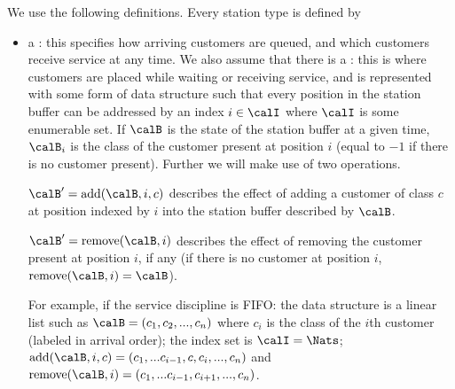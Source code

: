 We use the following definitions. Every station
type is defined by
%
\begin{itemize}
   \item a : this specifies how arriving
       customers are queued, and which customers receive
       service at any time.
    We also assume that there is a : this is where
    customers are placed while waiting or
    receiving service, and is represented with
    some form of data structure such that
    every position in the station buffer can be
    addressed by an index $i\in\calI$ where
    $\calI$ is some enumerable set. If $\calB$ is the state of
    the station buffer at a given time, $\calB_i$ is the class of the
    customer present at position $i$ (equal to
    $-1$ if there is no customer present).
    Further we will make use of
    two operations.

    $\calB' = \mathrm{add}(\calB,i,c)$ describes the
    effect of adding a customer of class
    $c$ at position indexed by $i$ into the station buffer described by
    $\calB$.

     $\calB' = \mathrm{remove}(\calB,i)$ describes the
    effect of removing the customer present at
    position $i$, if any (if there is no customer
    at position $i$,
    $\mathrm{remove}(\calB,i)=\calB$).


    For example, if the service discipline is
    FIFO: the data structure is a linear list such as
    $\calB=(c_1, c_2, ...,c_n)$ where $c_i$ is
    the class of the $i$th customer (labeled in
    arrival order); the index set is
    $\calI=\Nats$; $\mathrm{add}(\calB,i,c)=
    (c_1, ...c_{i-1}, c, c_i,..., c_n)$ and
    $\mathrm{remove}(\calB,i) = (c_1, ...c_{i-1}, c_{i+1},...,
    c_n)$.


\end{itemize}
